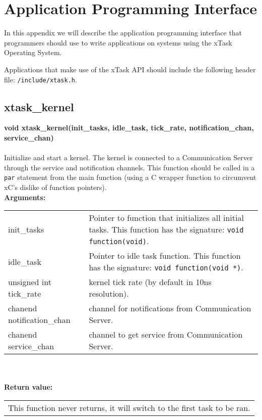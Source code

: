 \newpage
\section{Application Programming Interface}
In this appendix we will describe the application programming interface that
programmers should use to write applications on systems using the
xTask Operating System.

Applications that make use of the xTask API should include the following 
header file: \verb|/include/xtask.h|.

\subsection{xtask\_kernel}
\noindent
\textbf{void xtask\_kernel(init\_tasks, idle\_task, tick\_rate,
notification\_chan, service\_chan)}\\\\
Initialize and start a kernel. The kernel is connected to a 
Communication Server through the service and notification channels.
This function should be called in a \verb|par| statement from the main function 
(using a C wrapper function to circumvent xC's dislike of function pointers).\\

\noindent
\textbf{Arguments:}\\
\indent\begin{tabular}{ p{4.5cm}  p{9cm} }
init\_tasks & Pointer to function that initializes all initial tasks.
              This function has the signature: \verb|void function(void)|. \\
idle\_task  & Pointer to idle task function.
              This function has the signature: \verb|void function(void *)|.\\
unsigned int
tick\_rate  & kernel tick rate (by default in 10ns resolution).\\
chanend
notification\_chan & channel for notifications from Communication Server.\\
chanend
service\_chan      & channel to get service from Communication Server.
\end{tabular}\\\\

\noindent
\textbf{Return value:}\\
\indent\begin{tabular}{  p{13.5cm} }
This function never returns, it will switch to the first task to be ran.
\end{tabular}

